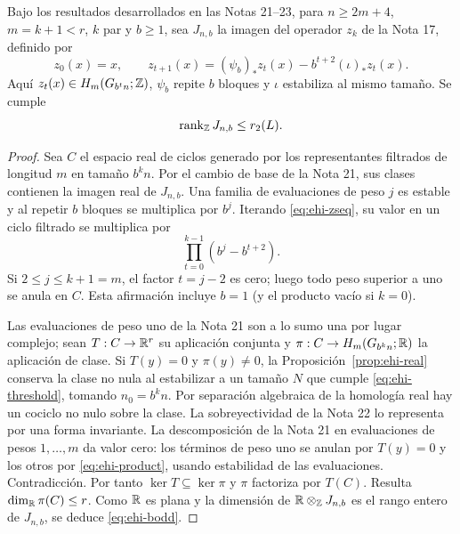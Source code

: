 \begin{proposicion}
\label{prop:ehi-bodd}
Bajo los resultados desarrollados en las Notas 21--23, para $n\ge2m+4$, $m=k+1<r$, $k$ par y $b\ge1$, sea $J_{n,b}$ la imagen del operador $z_k$ de la Nota 17, definido por
\begin{equation}
 z_0(x)=x,\qquad z_{t+1}(x)=(\psi_b)_*z_t(x)-b^{t+2}(\iota)_*z_t(x).
 \label{eq:ehi-zseq}
\end{equation}
Aquí $z_t(x)\in H_m(G_{b^tn};\mathbb{Z})$, $\psi_b$ repite $b$ bloques y $\iota$ estabiliza al mismo tamaño. Se cumple
\begin{equation}
 \operatorname{rank}_{\mathbb{Z}} J_{n,b}\le r_2(L).
 \label{eq:ehi-bodd}
\end{equation}
\end{proposicion}
\begin{proof}
Sea $C$ el espacio real de ciclos generado por los representantes filtrados de longitud $m$ en tamaño $b^kn$. Por el cambio de base de la Nota 21, sus clases contienen la imagen real de $J_{n,b}$. Una familia de evaluaciones de peso $j$ es estable y al repetir $b$ bloques se multiplica por $b^j$. Iterando \eqref{eq:ehi-zseq}, su valor en un ciclo filtrado se multiplica por
\begin{equation}
 \prod_{t=0}^{k-1}(b^j-b^{t+2}).
 \label{eq:ehi-product}
\end{equation}
Si $2\le j\le k+1=m$, el factor $t=j-2$ es cero; luego todo peso superior a uno se anula en $C$. Esta afirmación incluye $b=1$ (y el producto vacío si $k=0$).

Las evaluaciones de peso uno de la Nota 21 son a lo sumo una por lugar complejo; sean $T:C\to\mathbb{R}^r$ su aplicación conjunta y $\pi:C\to H_m(G_{b^kn};\mathbb{R})$ la aplicación de clase. Si $T(y)=0$ y $\pi(y)\ne0$, la Proposición~\ref{prop:ehi-real} conserva la clase no nula al estabilizar a un tamaño $N$ que cumple \eqref{eq:ehi-threshold}, tomando $n_0=b^kn$. Por separación algebraica de la homología real hay un cociclo no nulo sobre la clase. La sobreyectividad de la Nota 22 lo representa por una forma invariante. La descomposición de la Nota 21 en evaluaciones de pesos $1,\ldots,m$ da valor cero: los términos de peso uno se anulan por $T(y)=0$ y los otros por \eqref{eq:ehi-product}, usando estabilidad de las evaluaciones. Contradicción. Por tanto $\ker T\subseteq\ker\pi$ y $\pi$ factoriza por $T(C)$. Resulta $\dim_{\mathbb{R}}\pi(C)\le r$. Como $\mathbb{R}$ es plana y la dimensión de $\mathbb{R}\otimes_{\mathbb{Z}} J_{n,b}$ es el rango entero de $J_{n,b}$, se deduce \eqref{eq:ehi-bodd}.
\end{proof}


